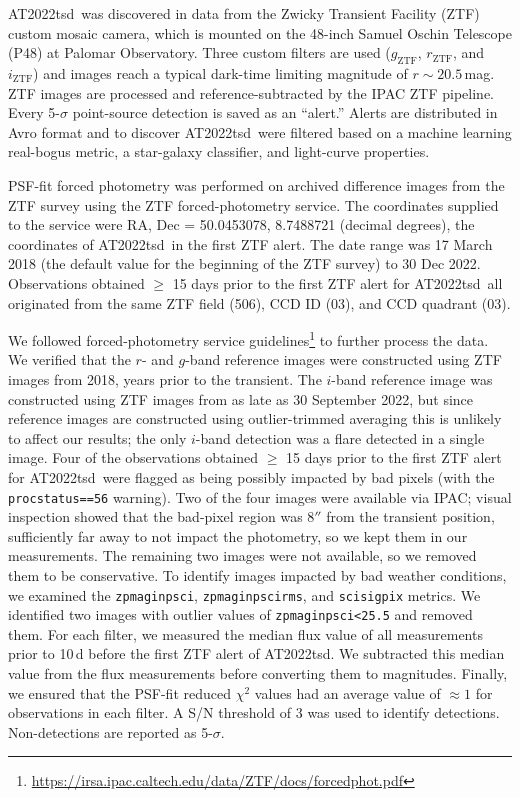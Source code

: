 \documentclass{nature_plusfigure}
\newcommand{\at}{AT2022tsd}
\begin{document}
\begin{methods}
\at\ was discovered in data from the Zwicky Transient Facility (ZTF) custom mosaic camera\cite{Dekany2020}, which is mounted on the 48-inch Samuel Oschin Telescope (P48) at Palomar Observatory.
Three custom filters are used ($g_{\mathrm{ZTF}}$, $r_{\mathrm{ZTF}}$, and $i_{\mathrm{ZTF}}$\cite{Dekany2020})
and images reach a typical dark-time limiting magnitude of $r\sim20.5\,$mag.
ZTF images are processed and reference-subtracted
by the IPAC ZTF pipeline\cite{Masci2019}.
Every 5-$\sigma$ point-source detection is saved as an ``alert.''
Alerts are distributed in Avro format\cite{Patterson2019} and to discover \at\ were filtered based on a machine learning real-bogus metric\cite{Duev2019}, a star-galaxy classifier\cite{Tachibana2018}, and light-curve properties.

PSF-fit forced photometry was performed on archived difference images from the ZTF survey using the ZTF forced-photometry service\cite{Masci2019}. The coordinates supplied to the service were RA, Dec = 50.0453078, 8.7488721 (decimal degrees), the coordinates of \at\ in the first ZTF alert. The date range was 17 March 2018 (the default value for the beginning of the ZTF survey) to 30 Dec 2022.
Observations obtained $\geq$ 15 days prior to the first ZTF alert for \at\ all originated from the same ZTF field (506), CCD ID (03), and CCD quadrant (03). 

We followed forced-photometry service guidelines\footnote{\url{https://irsa.ipac.caltech.edu/data/ZTF/docs/forcedphot.pdf}} to further process the data.
We verified that the $r$- and $g$-band reference images were constructed using ZTF images from 2018, years prior to the transient. The $i$-band reference image was constructed using ZTF images from as late as 30 September 2022, but since reference images are constructed using outlier-trimmed averaging\cite{Masci2019} this is unlikely to affect our results; the only $i$-band detection was a flare detected in a single image. 
Four of the observations obtained $\geq$ 15 days prior to the first ZTF alert for \at\ were flagged as being possibly impacted by bad pixels (with the \texttt{procstatus==56} warning).
Two of the four images were available via IPAC; visual inspection showed that the bad-pixel region was 8$''$ from the transient position, sufficiently far away to not impact the photometry, so we kept them in our measurements.
The remaining two images were not available, so we removed them to be conservative.
To identify images impacted by bad weather conditions, we examined the \texttt{zpmaginpsci}, \texttt{zpmaginpscirms}, and \texttt{scisigpix} metrics. We identified two images with outlier values of \texttt{zpmaginpsci<25.5} and removed them.
For each filter, we measured the median flux value of all measurements prior to 10\,d before the first ZTF alert of \at. We subtracted this median value from the flux measurements before converting them to magnitudes.
Finally, we ensured that the PSF-fit reduced $\chi^2$ values had an average value of $\approx1$ for observations in each filter.
A S/N threshold of 3 was used to identify detections. Non-detections are reported as 5-$\sigma$.


\end{methods}
\end{document}
